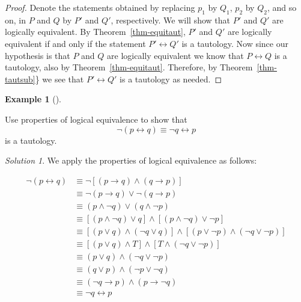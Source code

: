 \documentclass[
  letterpaper,
  10pt,
  reqno,
  twopage,
  openany]{book}
\theoremstyle{plain}
\theoremstyle{definition}
\theoremstyle{definition}
\theoremstyle{definition}
\newtheorem{example}{Example}[chapter]
\theoremstyle{plain}
\theoremstyle{plain}
\theoremstyle{remark}
\newtheorem*{solution}{Solution}
\begin{document}
\begin{proof}

Denote the statements obtained by replacing \(p_1\) by \(Q_1\), \(p_2\)
by \(Q_2\), and so on, in \(P\) and \(Q\) by \(P'\) and \(Q'\),
respectively. We will show that \(P'\) and \(Q'\) are logically
equivalent. By Theorem~\ref{thm-equitaut}, \(P'\) and \(Q'\) are
logically equivalent if and only if the statement
\(P'\leftrightarrow Q'\) is a tautology. Now since our hypothesis is
that \(P\) and \(Q\) are logically equivalent we know that
\(P\leftrightarrow Q\) is a tautology, also by
Theorem~\ref{thm-equitaut}. Therefore, by Theorem~\ref{thm-tautsub}\} we
see that \(P'\leftrightarrow Q'\) is a tautology as needed.

\end{proof}

\leavevmode{}%
\begin{example}[]\label{exm-tautology-5}

Use properties of logical equivalence to show that \begin{equation}
\neg (p\leftrightarrow q)\equiv \neg q\leftrightarrow p
\end{equation} is a tautology.

\end{example}

\begin{solution}

We apply the properties of logical equivalence as follows:

\begin{align*}
\neg (p\leftrightarrow q) & \equiv \neg [(p\rightarrow q)\land (q\rightarrow p)] \\
& \equiv \neg (p\rightarrow q)\lor \neg (q\rightarrow p) \\
& \equiv (p\land \neg q) \lor (q\land \neg p) \\
& \equiv [(p\land \neg q)\lor q]\land [(p\land \neg q)\lor \neg p] \\
& \equiv [(p\lor q)\land (\neg q\lor q)] \land [(p\lor \neg p) \land (\neg q \lor \neg p) ] \\
& \equiv [(p\lor q) \land T] \land [T\land (\neg q \lor \neg p)] \\
& \equiv (p\lor q) \land (\neg q \lor \neg p) \\
& \equiv (q\lor p) \land (\neg p \lor \neg q) \\
& \equiv (\neg q\rightarrow p)\land (p\rightarrow \neg q) \\
& \equiv \neg q \leftrightarrow p
\end{align*}

\end{solution}
\end{document}

